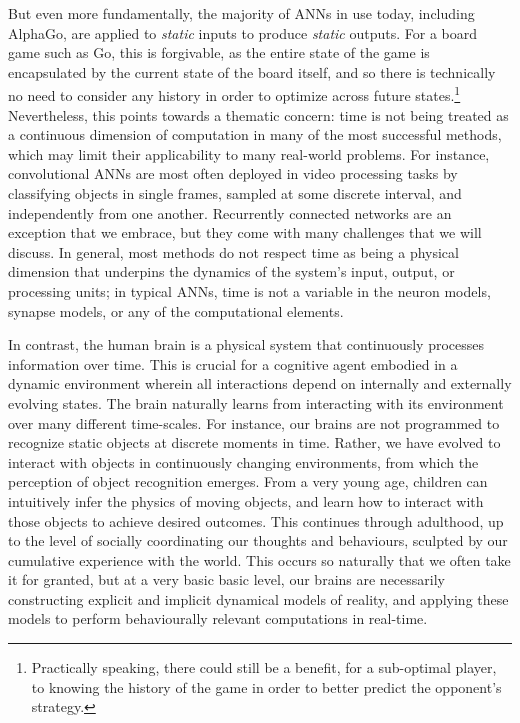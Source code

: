 But even more fundamentally, the majority of ANNs in use today, including AlphaGo, are applied to \emph{static} inputs to produce \emph{static} outputs.
For a board game such as Go, this is forgivable, as the entire state of the game is encapsulated by the current state of the board itself, and so there is technically no need to consider any history in order to optimize across future states.\footnote{%
Practically speaking, there could still be a benefit, for a sub-optimal player, to knowing the history of the game in order to better predict the opponent's strategy.}
Nevertheless, this points towards a thematic concern: time is not being treated as a continuous dimension of computation in many of the most successful methods, which may limit their applicability to many real-world problems.
For instance, convolutional ANNs are most often deployed in video processing tasks by classifying objects in single frames,  %
sampled at some discrete interval, and independently from one another.
Recurrently connected networks are an exception that we embrace, but they come with many challenges that we will discuss.
In general, most methods do not respect time as being a physical dimension that underpins the dynamics of the system's input, output, or processing units;
in typical ANNs, time is not a variable in the neuron models, synapse models, or any of the computational elements.

In contrast, the human brain is a physical system that continuously processes information over time.
This is crucial for a cognitive agent embodied in a dynamic environment wherein all interactions depend on internally and externally evolving states.
The brain naturally learns from interacting with its environment over many different time-scales. 
For instance, our brains are not programmed to recognize static objects at discrete moments in time.
Rather, we have evolved to interact with objects in continuously changing environments, from which the perception of object recognition emerges.
From a very young age, children can intuitively infer the physics of moving objects, and learn how to interact with those objects to achieve desired outcomes.
This continues through adulthood, up to the level of socially coordinating our thoughts and behaviours, sculpted by our cumulative experience with the world.
This occurs so naturally that we often take it for granted, but at a very basic basic level, our brains are necessarily constructing explicit and implicit dynamical models of reality, and applying these models
to perform behaviourally relevant computations in real-time.

